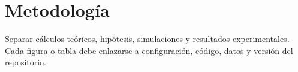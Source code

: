 \section{Metodología} Separar cálculos teóricos, hipótesis, simulaciones y resultados experimentales. Cada figura o tabla debe enlazarse a configuración, código, datos y versión del repositorio.
